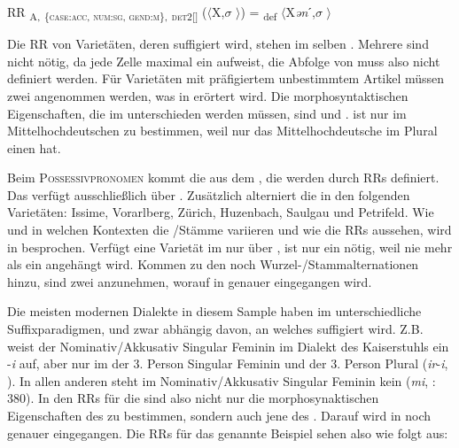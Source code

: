 \ea%
\label{ex:key:141}
 RR \textsubscript{A,} \textsubscript{\{\textsc{case:}}\textsubscript{\textsc{acc}}\textsubscript{, \textsc{num:sg}, \textsc{gend:m}\},} \textsubscript{\textsc{det2[]}} ($\langle$X,$\sigma$ $\rangle$) = \textsubscript{def} $\langle$X\textit{ən}ˊ,$\sigma$ $\rangle$\\
\z

Die RR von Varietäten, deren  suffigiert wird, stehen im selben . Mehrere  sind nicht nötig, da jede Zelle maximal ein  aufweist, die Abfolge von  muss also nicht definiert werden. Für Varietäten mit präfigiertem unbestimmtem Artikel müssen zwei  angenommen werden, was in  erörtert wird. Die morphosyntaktischen Eigenschaften, die im  unterschieden werden müssen, sind  und .  ist nur im Mittelhochdeutschen zu bestimmen, weil nur das Mittelhochdeutsche im Plural einen  hat.

Beim \textsc{Possessivpronomen} kommt die  aus dem , die  werden durch RRs definiert. Das  verfügt ausschließlich über . Zusätzlich alterniert die  in den folgenden Varietäten: Issime, Vorarlberg, Zürich, Huzenbach, Saulgau und Petrifeld. Wie und in welchen Kontexten die /Stämme variieren und wie die RRs aussehen, wird in  besprochen. Verfügt eine Varietät im  nur über , ist nur ein  nötig, weil nie mehr als ein  angehängt wird. Kommen zu den  noch Wur\-zel-/Stamm\-al\-ter\-na\-tio\-nen hinzu, sind zwei  anzunehmen, worauf in  genauer eingegangen wird.

Die meisten modernen Dialekte in diesem Sample haben im  unterschiedliche Suffixparadigmen, und zwar abhängig davon, an welches  suffigiert wird. Z.B. weist der Nominativ/Akkusativ Singular Feminin im Dialekt des Kaiserstuhls ein  -\textit{i} auf, aber nur im  der 3. Person Singular Feminin und der 3. Person Plural (\textit{ir}-\textit{i}, \citealt[382]{Noth1993}). In allen anderen  steht im Nominativ/Akkusativ Singular Feminin kein  (\textit{mi}, \citealt{Noth1993}: 380). In den RRs für die  sind also nicht nur die morphosynaktischen Eigenschaften des  zu bestimmen, sondern auch jene des . Darauf wird in  noch genauer eingegangen. Die RRs für das genannte Beispiel sehen also wie folgt aus:

